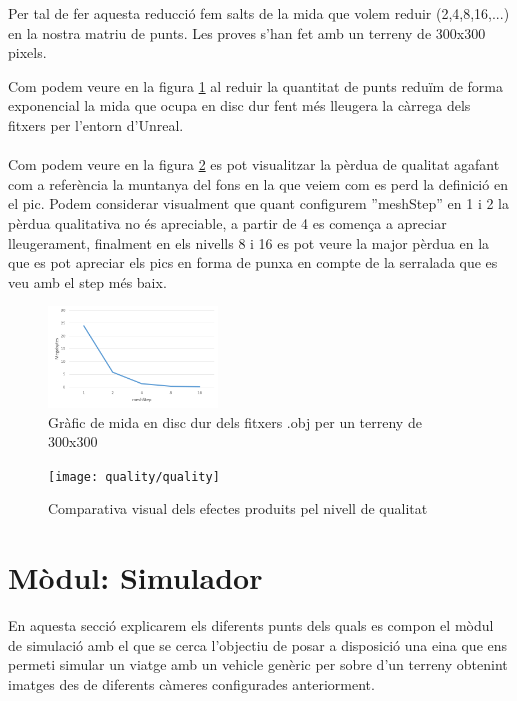 \documentclass[10pt,a4paper,twocolumn,twoside]{article}
\begin{document}
Per tal de fer aquesta reducció fem salts de la mida que volem reduir (2,4,8,16,...) en la nostra matriu de punts. Les proves s'han fet amb un terreny de 300x300 pixels. 

Com podem veure en la figura \ref{fig-qualitatmegas} al reduir la quantitat de punts reduïm de forma exponencial la mida que ocupa en disc dur fent més lleugera la càrrega dels fitxers per l'entorn d'Unreal.
\\
\\
Com podem veure en la figura \ref{fig-qualityvisual} es pot visualitzar la pèrdua de qualitat agafant com a referència la muntanya del fons en la que veiem com es perd la definició en el pic. Podem considerar visualment que quant configurem ''meshStep'' en 1 i 2 la pèrdua qualitativa no és apreciable, a partir de 4 es comença a apreciar lleugerament, finalment en els nivells 8 i 16 es pot veure la major pèrdua en la que es pot apreciar els pics en forma de punxa en compte de la serralada que es veu amb el step més baix.

\begin{figure}[!h]
\centering
  	\includegraphics[width=0.4\textwidth]{qualitatmegas}
	\caption{Gràfic de mida en disc dur dels fitxers .obj per un terreny de 300x300}
	\label{fig-qualitatmegas}
\end{figure}

\begin{figure}[!h]
\centering
  	\texttt{[image: quality/quality]}
	\caption{Comparativa visual dels efectes produits pel nivell de qualitat}
	\label{fig-qualityvisual}
\end{figure}


\section{Mòdul: Simulador}

En aquesta secció explicarem els diferents punts dels quals es compon el mòdul de simulació amb el que se cerca l'objectiu de posar a disposició una eina que ens permeti simular un viatge amb un vehicle genèric per sobre d'un terreny obtenint imatges des de diferents càmeres configurades anteriorment.
\end{document}
